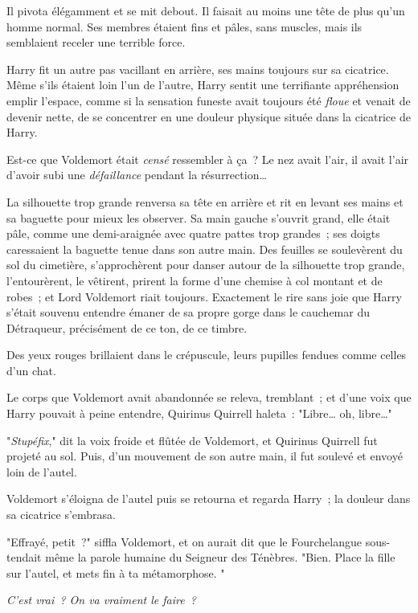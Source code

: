 Il pivota élégamment et se mit debout. Il faisait au moins une tête de plus qu'un homme normal. Ses membres étaient fins et pâles, sans muscles, mais ils semblaient receler une terrible force.

Harry fit un autre pas vacillant en arrière, ses mains toujours sur sa cicatrice. Même s'ils étaient loin l'un de l'autre, Harry sentit une terrifiante appréhension emplir l'espace, comme si la sensation funeste avait toujours été \emph{floue} et venait de devenir nette, de se concentrer en une douleur physique située dans la cicatrice de Harry.

Est-ce que Voldemort était \emph{censé} ressembler à ça~? Le nez avait l'air, il avait l'air d'avoir subi une \emph{défaillance} pendant la résurrection…

La silhouette trop grande renversa sa tête en arrière et rit en levant ses mains et sa baguette pour mieux les observer. Sa main gauche s'ouvrit grand, elle était pâle, comme une demi-araignée avec quatre pattes trop grandes~; ses doigts caressaient la baguette tenue dans son autre main. Des feuilles se soulevèrent du sol du cimetière, s'approchèrent pour danser autour de la silhouette trop grande, l'entourèrent, le vêtirent, prirent la forme d'une chemise à col montant et de robes~; et Lord Voldemort riait toujours. Exactement le rire sans joie que Harry s'était souvenu entendre émaner de sa propre gorge dans le cauchemar du Détraqueur, précisément de ce ton, de ce timbre.

Des yeux rouges brillaient dans le crépuscule, leurs pupilles fendues comme celles d'un chat.

Le corps que Voldemort avait abandonnée se releva, tremblant~; et d'une voix que Harry pouvait à peine entendre, Quirinus Quirrell haleta~: "Libre… oh, libre…"

"\emph{Stupéfix}," dit la voix froide et flûtée de Voldemort, et Quirinus Quirrell fut projeté au sol. Puis, d'un mouvement de son autre main, il fut soulevé et envoyé loin de l'autel.

Voldemort s'éloigna de l'autel puis se retourna et regarda Harry~; la douleur dans sa cicatrice s'embrasa.

"Effrayé, petit~?" siffla Voldemort, et on aurait dit que le Fourchelangue sous-tendait même la parole humaine du Seigneur des Ténèbres. "Bien. Place la fille sur l'autel, et mets fin à ta métamorphose. "

\emph{C'est vrai~? On va vraiment le faire~?}

